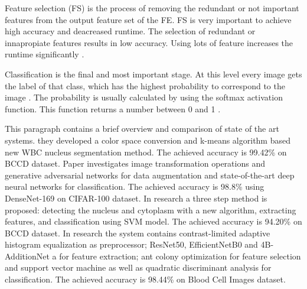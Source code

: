 Feature selection (FS) is the process of removing the redundant or not important features from the output feature set of the FE. FS is very important to achieve high accuracy and deacreased runtime. The selection of redundant or innapropiate features results in low accuracy. Using lots of feature increases the runtime significantly
.

Classification is the final and most important stage. At this level every image gets the label of that class, which has the highest probability to correspond to the image
. The probability is usually calculated by using the softmax activation function. This function returns a number between 0 and 1
. 

This paragraph contains a brief overview and comparison of state of the art systems.  
they developed a color space conversion and k-means algorithm based new WBC nucleus segmentation method. The achieved accuracy is 99.42\% on BCCD dataset.
Paper 
investigates image transformation operations and generative adversarial networks for data augmentation and state-of-the-art deep neural networks for classification. The achieved accuracy is 98.8\% using DenseNet-169 on CIFAR-100 dataset.
In
research a three step method is proposed: detecting the nucleus and cytoplasm with a new algorithm, extracting features, and classification using SVM model. The achieved accuracy is 94.20\% on BCCD dataset.
In
 research the system contains contrast-limited adaptive histogram equalization as preprocessor; ResNet50, EfficientNetB0 and 4B-AdditionNet a for feature extraction; ant colony optimization for feature selection and support vector machine as well as quadratic discriminant analysis for classification. The achieved accuracy is 98.44\% on Blood Cell Images dataset.

